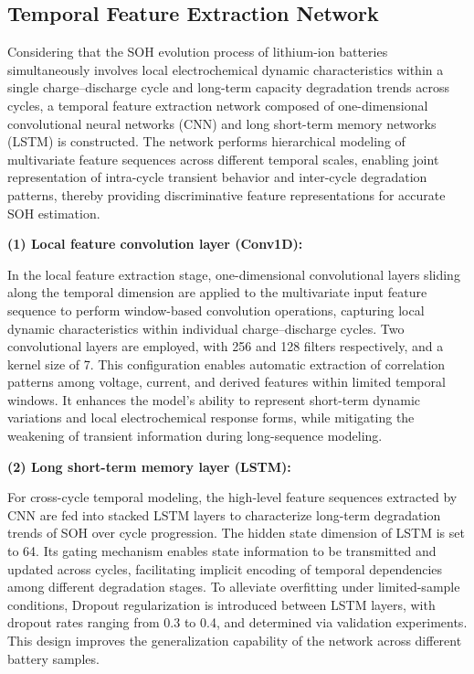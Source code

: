 \documentclass[a4paper,fleqn]{cas-dc}
\begin{document}
\subsection{Temporal Feature Extraction Network}
\label{subsec:temporal_feature}

Considering that the SOH evolution process of lithium-ion batteries simultaneously involves local electrochemical dynamic characteristics within a single charge–discharge cycle and long-term capacity degradation trends across cycles, a temporal feature extraction network composed of one-dimensional convolutional neural networks (CNN) and long short-term memory networks (LSTM) is constructed. The network performs hierarchical modeling of multivariate feature sequences across different temporal scales, enabling joint representation of intra-cycle transient behavior and inter-cycle degradation patterns, thereby providing discriminative feature representations for accurate SOH estimation.

\textbf{(1) Local feature convolution layer (Conv1D):}

In the local feature extraction stage, one-dimensional convolutional layers sliding along the temporal dimension are applied to the multivariate input feature sequence to perform window-based convolution operations, capturing local dynamic characteristics within individual charge–discharge cycles. Two convolutional layers are employed, with 256 and 128 filters respectively, and a kernel size of 7. This configuration enables automatic extraction of correlation patterns among voltage, current, and derived features within limited temporal windows. It enhances the model’s ability to represent short-term dynamic variations and local electrochemical response forms, while mitigating the weakening of transient information during long-sequence modeling.

\textbf{(2) Long short-term memory layer (LSTM):}

For cross-cycle temporal modeling, the high-level feature sequences extracted by CNN are fed into stacked LSTM layers to characterize long-term degradation trends of SOH over cycle progression. The hidden state dimension of LSTM is set to 64. Its gating mechanism enables state information to be transmitted and updated across cycles, facilitating implicit encoding of temporal dependencies among different degradation stages. To alleviate overfitting under limited-sample conditions, Dropout regularization is introduced between LSTM layers, with dropout rates ranging from 0.3 to 0.4, and determined via validation experiments. This design improves the generalization capability of the network across different battery samples.
\end{document}
